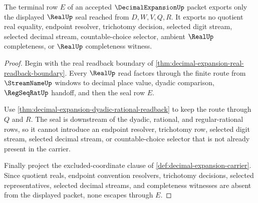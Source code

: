 \begin{theorem}\label{thm:decimal-expansion-real-seal-nonescape}
The terminal row $E$ of an accepted $\DecimalExpansionUp$ packet exports only the displayed $\RealUp$ seal reached from $D,W,V,Q,R$. It exports no quotient real equality, endpoint resolver, trichotomy decision, selected digit stream, selected decimal stream, countable-choice selector, ambient $\RealUp$ completeness, or $\RealUp$ completeness witness.
\end{theorem}
\begin{proof}
Begin with the real readback boundary of \autoref{thm:decimal-expansion-real-readback-boundary}. Every $\RealUp$ read factors through the finite route from $\StreamNameUp$ windows to decimal place value, dyadic comparison, $\RegSeqRatUp$ handoff, and then the seal row $E$.

Use \autoref{thm:decimal-expansion-dyadic-rational-readback} to keep the route through $Q$ and $R$. The seal is downstream of the dyadic, rational, and regular-rational rows, so it cannot introduce an endpoint resolver, trichotomy row, selected digit stream, selected decimal stream, or countable-choice selector that is not already present in the carrier.

Finally project the excluded-coordinate clause of \autoref{def:decimal-expansion-carrier}. Since quotient reals, endpoint convention resolvers, trichotomy decisions, selected representatives, selected decimal streams, and completeness witnesses are absent from the displayed packet, none escapes through $E$.
\end{proof}

